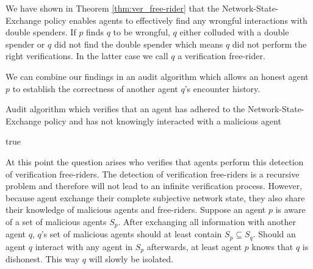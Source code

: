 We have shown in Theorem \ref{thm:ver_free-rider} that the Network-State-Exchange policy enables 
agents to effectively find any wrongful interactions with double spenders. If $p$ finds $q$ to
be wrongful, $q$ either colluded with a double spender or $q$ did not find the double spender which 
means $q$ did not perform the right verifications. In the latter case we call $q$ a verification 
free-rider.

We can combine our findings in an audit algorithm which allows an honest agent $p$ to establish the 
correctness of another agent $q$'s encounter history. 

\begin{algorithm}
\caption{Audit algorithm which verifies that an agent has adhered to the Network-State-Exchange 
policy and has not knowingly interacted with a malicious agent}\label{alg:verify_exchange}
\begin{algorithmic}[1]
\Else
{}
\EndIf
\EndIf
{}
\EndIf
{}
\EndIf
\EndIf
\EndFor
\Return true
\EndProcedure
\end{algorithmic}
\end{algorithm}

At this point the question arises who verifies that agents perform this detection of verification 
free-riders. The detection of verification free-riders is a recursive problem and therefore will not
lead to an infinite verification process. However, because agent exchange their complete subjective
network state, they also share their knowledge of malicious agents and free-riders. Suppose an agent
$p$ is aware of a set of malicious agents $S_p$. After exchanging all information with another agent
$q$, $q$'s set of malicious agents should at least contain $S_p \subseteq S_q$. Should an agent $q$ 
interact with any agent in $S_p$ afterwards, at least agent $p$ knows that $q$ is dishonest. This 
way $q$ will slowly be isolated.

